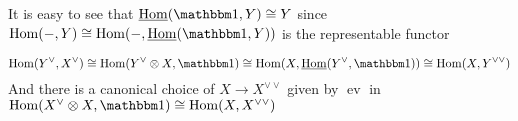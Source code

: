 \documentclass[main]{subfiles}
\begin{document}
\begin{remark}
It is easy to see that $\underline\Hom(\mathbbm1,Y)\cong Y$ since $\Hom(-,Y)\cong\Hom(-,\underline\Hom(\mathbbm1, Y))$ is the representable functor
\end{remark}

\begin{remark}
\[\Hom(Y^\vee,X^\vee)\cong\Hom(Y^\vee\otimes X,\mathbbm 1)\cong\Hom(X,\underline{\Hom}(Y^\vee,\mathbbm1))\cong\Hom(X,Y^{\vee\vee})\]
And there is a canonical choice of $X\to X^{\vee\vee}$ given by $\operatorname{ev}$ in $\Hom(X^\vee\otimes X,\mathbbm1)\cong\Hom(X,X^{\vee\vee})$
\end{remark}
\end{document}
